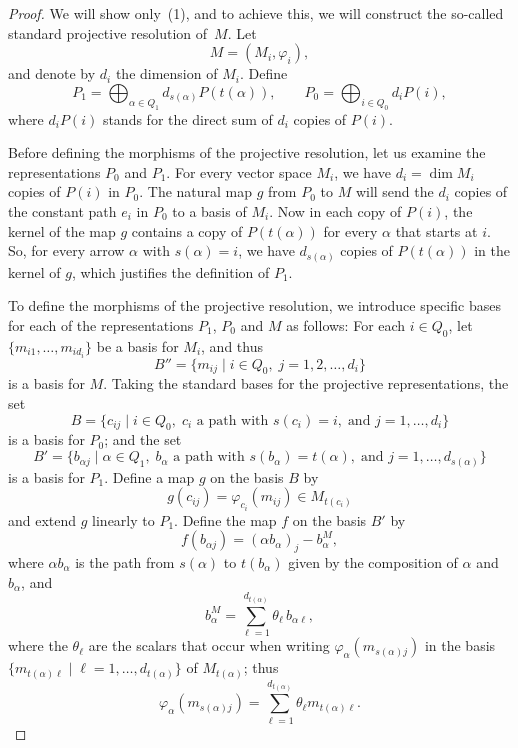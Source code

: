 \documentclass[11pt, a4paper]{report}
\begin{document}
    \begin{proof}
        We will show only~(1), and to achieve this, we will construct the so-called
        standard projective resolution of~$M$. Let
        \[
        M=(M_i,\varphi_i),
        \]
        and denote by $d_i$ the dimension of $M_i$. Define
        \[
        P_1=\bigoplus_{\alpha\in Q_1} d_{s(\alpha)}P(t(\alpha)),
        \qquad
        P_0=\bigoplus_{i\in Q_0} d_iP(i),
        \]
        where $d_iP(i)$ stands for the direct sum of $d_i$ copies of $P(i)$.

        Before defining the morphisms of the projective resolution, let us examine the
        representations $P_0$ and $P_1$. For every vector space $M_i$, we have
        $d_i=\dim M_i$ copies of $P(i)$ in $P_0$. The natural map $g$ from $P_0$ to $M$
        will send the $d_i$ copies of the constant path $e_i$ in $P_0$ to a basis of $M_i$.
        Now in each copy of $P(i)$, the kernel of the map $g$ contains a copy of $P(t(\alpha))$
        for every $\alpha$ that starts at $i$. So, for every arrow $\alpha$ with $s(\alpha)=i$,
        we have $d_{s(\alpha)}$ copies of $P(t(\alpha))$ in the kernel of $g$, which justifies
        the definition of $P_1$.

        To define the morphisms of the projective resolution, we introduce specific bases
        for each of the representations $P_1$, $P_0$ and $M$ as follows: For each
        $i\in Q_0$, let $\{m_{i1},\ldots,m_{id_i}\}$ be a basis for $M_i$, and thus
        \[
        B''=\{m_{ij}\mid i\in Q_0,\; j=1,2,\ldots,d_i\}
        \]
        is a basis for $M$. Taking the standard bases for the projective representations, the set
        \[
        B=\{c_{ij}\mid i\in Q_0,\; c_i \text{ a path with } s(c_i)=i,\; \text{and } j=1,\ldots,d_i\}
        \]
        is a basis for $P_0$; and the set
        \[
        B'=\{b_{\alpha j}\mid \alpha\in Q_1,\; b_\alpha \text{ a path with } s(b_\alpha)=t(\alpha),\;
        \text{and } j=1,\ldots,d_{s(\alpha)}\}
        \]
        is a basis for $P_1$. Define a map $g$ on the basis $B$ by
        \[
        g(c_{ij})=\varphi_{c_i}(m_{ij})\in M_{t(c_i)}
        \]
        and extend $g$ linearly to $P_1$. Define the map $f$ on the basis $B'$ by
        \[
        f(b_{\alpha j})=(\alpha b_\alpha)_j-b_\alpha^M,
        \]
        where $\alpha b_\alpha$ is the path from $s(\alpha)$ to $t(b_\alpha)$ given by the
        composition of $\alpha$ and $b_\alpha$, and
        \[
        b_\alpha^M=\sum_{\ell=1}^{d_{t(\alpha)}} \theta_\ell\, b_{ \alpha \ell},
        \]
        where the $\theta_\ell$ are the scalars that occur when writing
        $\varphi_\alpha(m_{s(\alpha)j})$ in the basis
        $\{m_{t(\alpha)\ell}\mid \ell=1,\ldots,d_{t(\alpha)}\}$ of $M_{t(\alpha)}$; thus
        \begin{equation}
        \varphi_\alpha(m_{s(\alpha)j})=\sum_{\ell=1}^{d_{t(\alpha)}} \theta_\ell m_{t(\alpha)\ell}.
        \tag{2.2}
        \end{equation}


\end{proof}
\end{document}
